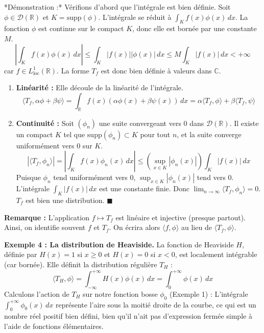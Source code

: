 \documentclass[11pt,a4paper]{article}
\begin{document}
*Démonstration :*
Vérifions d'abord que l'intégrale est bien définie. Soit $\phi \in \mathcal{D}(\mathbb{R})$ et $K = \text{supp}(\phi)$. L'intégrale se réduit à $\int_K f(x) \phi(x) \, dx$.
La fonction $\phi$ est continue sur le compact $K$, donc elle est bornée par une constante $M$.
$$ \left| \int_K f(x) \phi(x) \, dx \right| \le \int_K |f(x)| |\phi(x)| \, dx \le M \int_K |f(x)| \, dx < +\infty $$
car $f \in L^1_{\text{loc}}(\mathbb{R})$. La forme $T_f$ est donc bien définie à valeurs dans $\mathbb{C}$.

\begin{enumerate}
\item \textbf{Linéarité :} Elle découle de la linéarité de l'intégrale.
   $$ \langle T_f, \alpha \phi + \beta \psi \rangle = \int_{\mathbb{R}} f(x) (\alpha \phi(x) + \beta \psi(x)) \, dx = \alpha \langle T_f, \phi \rangle + \beta \langle T_f, \psi \rangle $$
\item \textbf{Continuité :} Soit $(\phi_n)$ une suite convergeant vers $0$ dans $\mathcal{D}(\mathbb{R})$.
   Il existe un compact $K$ tel que $\text{supp}(\phi_n) \subset K$ pour tout $n$, et la suite converge uniformément vers $0$ sur $K$.
   $$ |\langle T_f, \phi_n \rangle| = \left| \int_K f(x) \phi_n(x) \, dx \right| \le \left( \sup_{x \in K} |\phi_n(x)| \right) \int_K |f(x)| \, dx $$
   Puisque $\phi_n$ tend uniformément vers $0$, $\sup_{x \in K} |\phi_n(x)|$ tend vers $0$.
   L'intégrale $\int_K |f(x)| \, dx$ est une constante finie. Donc $\lim_{n \to \infty} \langle T_f, \phi_n \rangle = 0$.
   $T_f$ est bien une distribution.
$\blacksquare$
\end{enumerate}

\textbf{Remarque :} L'application $f \mapsto T_f$ est linéaire et injective (presque partout). Ainsi, on identifie souvent $f$ et $T_f$. On écrira alors $\langle f, \phi \rangle$ au lieu de $\langle T_f, \phi \rangle$.

\textbf{Exemple 4 : La distribution de Heaviside.}
La fonction de Heaviside $H$, définie par $H(x) = 1$ si $x \ge 0$ et $H(x) = 0$ si $x < 0$, est localement intégrable (car bornée).
Elle définit la distribution régulière $T_H$ :
$$ \langle T_H, \phi \rangle = \int_{-\infty}^{+\infty} H(x) \phi(x) \, dx = \int_0^{+\infty} \phi(x) \, dx $$
Calculons l'action de $T_H$ sur notre fonction bosse $\phi_0$ (Exemple 1) :
L'intégrale $\int_0^{+\infty} \phi_0(x) \, dx$ représente l'aire sous la moitié droite de la courbe, ce qui est un nombre réel positif bien défini, bien qu'il n'ait pas d'expression fermée simple à l'aide de fonctions élémentaires.
\end{document}
